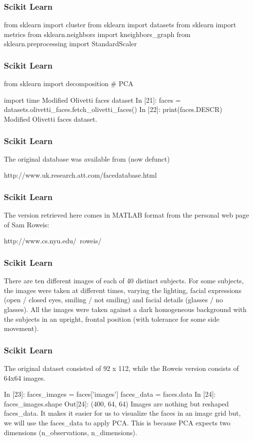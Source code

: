 \begin{frame}[fragile]
	\frametitle{Scikit Learn}

from sklearn import cluster
from sklearn import datasets
from sklearn import metrics
from sklearn.neighbors import kneighbors_graph
from sklearn.preprocessing import StandardScaler
\end{frame}
\begin{frame}[fragile]
	\frametitle{Scikit Learn}
from sklearn import decomposition # PCA

import time
Modified Olivetti faces dataset
In [21]:
faces = datasets.olivetti_faces.fetch_olivetti_faces()
In [22]:
print(faces.DESCR)
Modified Olivetti faces dataset.
\end{frame}
\begin{frame}[fragile]
	\frametitle{Scikit Learn}
The original database was available from (now defunct)

    http://www.uk.research.att.com/facedatabase.html
\end{frame}
\begin{frame}[fragile]
	\frametitle{Scikit Learn}
The version retrieved here comes in MATLAB format from the personal
web page of Sam Roweis:

    http://www.cs.nyu.edu/~roweis/
\end{frame}
\begin{frame}[fragile]
	\frametitle{Scikit Learn}
There are ten different images of each of 40 distinct subjects. For some
subjects, the images were taken at different times, varying the lighting,
facial expressions (open / closed eyes, smiling / not smiling) and facial
details (glasses / no glasses). All the images were taken against a dark
homogeneous background with the subjects in an upright, frontal position (with
tolerance for some side movement).
\end{frame}
\begin{frame}[fragile]
	\frametitle{Scikit Learn}
The original dataset consisted of 92 x 112, while the Roweis version
consists of 64x64 images.


In [23]:
faces_images = faces['images']
faces_data = faces.data
In [24]:
faces_images.shape
Out[24]:
(400, 64, 64)
Images are nothing but reshaped faces_data. It makes it easier for us to visualize the faces in an image grid but, we will use the faces_data to apply PCA. This is because PCA expects two dimensions (n_observations, n_dimensions).
\end{frame}
